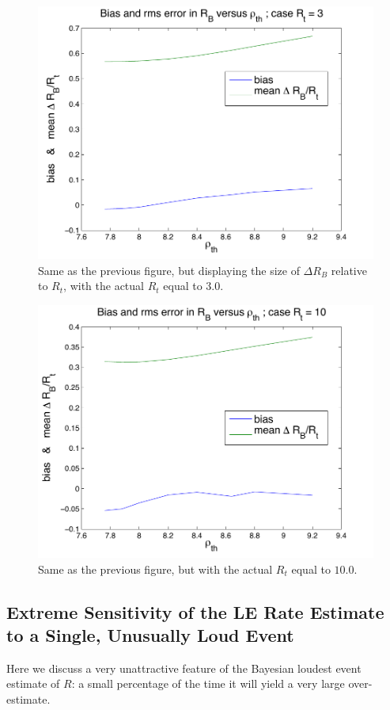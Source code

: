 \documentclass[aps,prd]{revtex4-1}
\begin{document}
\begin{figure}
\includegraphics[width=\columnwidth]{Rt3}
\caption{\label{fig:Rt3} Same as the previous figure, but displaying the size of $\Delta R_B$  relative to $R_t$, with the actual $R_t$ equal to $3.0$.}
\end{figure} 

\begin{figure}
\includegraphics[width=\columnwidth]{Rt10}
\caption{\label{fig:Rt10} Same as the previous figure, but with the actual $R_t$ equal to $10.0$.}
\end{figure} 

\subsection{Extreme Sensitivity of the LE Rate Estimate to a Single, Unusually Loud Event}
Here we discuss a very unattractive feature of the Bayesian loudest event estimate of $R$:
a small percentage of the time it will yield a very large over-estimate.  
\end{document}
